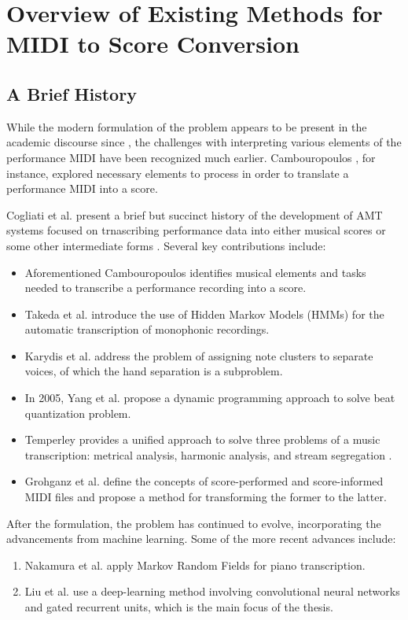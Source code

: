 \chapter{Overview of Existing Methods for MIDI to Score Conversion}

\section{A Brief History}

While the modern formulation of the problem appears to be present in the academic discourse since \cite{Cogliati2016}, the challenges with interpreting various elements of the performance MIDI have been recognized much earlier. Cambouropoulos \cite{Cambouropoulos2000}, for instance, explored necessary elements to process in order to translate a performance MIDI into a score.

Cogliati et al. present a brief but succinct history of the development of AMT systems focused on trnascribing performance data into either musical scores or some other intermediate forms \cite{Cogliati2016}. Several key contributions include:
\begin{itemize}
	\item Aforementioned Cambouropoulos \cite{Cambouropoulos2000} identifies musical elements and tasks needed to transcribe a performance recording into a score.
	\item Takeda et al. \cite{Takeda2002} introduce the use of Hidden Markov Models (HMMs) for the automatic transcription of monophonic recordings.
	\item Karydis et al. \cite{Karydis2007} address the problem of assigning note clusters to separate voices, of which the hand separation is a subproblem.
	\item In 2005, Yang et al. \cite{Yang2005} propose a dynamic programming approach to solve beat quantization problem.
	\item Temperley provides a unified approach to solve three problems of a music transcription: metrical analysis, harmonic analysis, and stream segregation \cite{Temperley2009}.
	\item Grohganz et al. \cite{Grohganz2014} define the concepts of score-performed and score-informed MIDI files and propose a method for transforming the former to the latter.
\end{itemize}

After the formulation, the problem has continued to evolve, incorporating the advancements from machine learning. Some of the more recent advances include:
\begin{enumerate}
	\item Nakamura et al. \cite{Nakamura2017a} apply Markov Random Fields for piano transcription.
	\item Liu et al. \cite{Liu2022} use a deep-learning method involving convolutional neural networks and gated recurrent units, which is the main focus of the thesis.
\end{enumerate}

